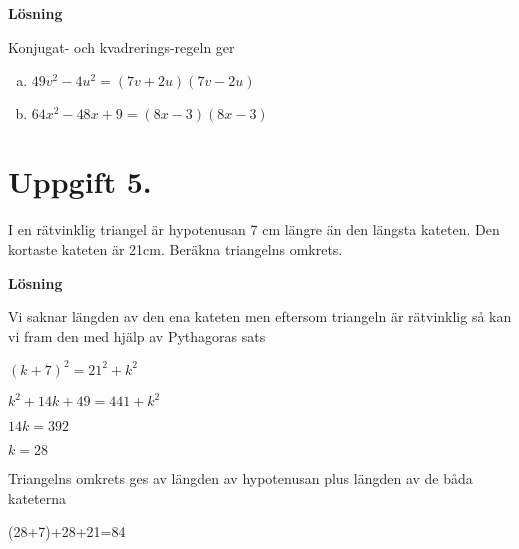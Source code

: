 \documentclass{article}
\begin{document}
\textbf{Lösning}

Konjugat- och kvadrerings-regeln ger
\begin{enumerate}[(a)]
\item $49v^2-4u^2=(7v+2u)(7v-2u)$
\item $64x^2-48x+9=(8x-3)(8x-3)$
\end{enumerate}

\section*{Uppgift 5.}
I en rätvinklig triangel är hypotenusan 7 cm längre än den längsta kateten. Den kortaste kateten är 21cm. Beräkna triangelns omkrets.

\textbf{Lösning}

Vi saknar längden av den ena kateten men eftersom triangeln är rätvinklig så kan vi fram den med hjälp av Pythagoras sats

$(k+7)^2=21^2+k^2$

$k^2+14k+49=441+k^2$

$14k=392$

$k=28$

Triangelns omkrets ges av längden av hypotenusan plus längden av de båda kateterna

(28+7)+28+21=84
\end{document}
